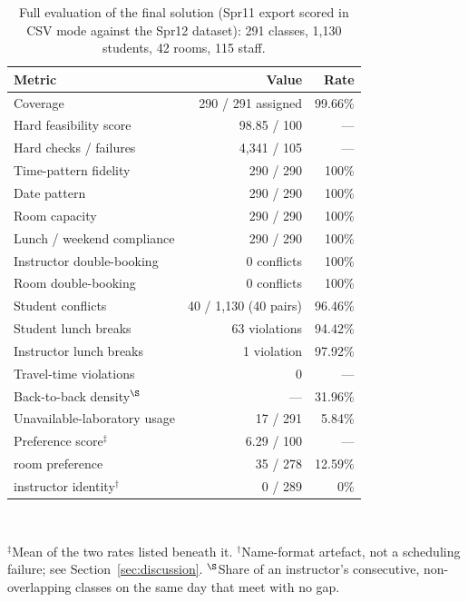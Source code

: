 \documentclass[journal]{IEEEtran}
\begin{document}
\begin{table}[t]
\centering
\caption{Full evaluation of the final solution (Spr11 export scored in CSV mode against the Spr12 dataset): 291 classes, 1{,}130 students, 42 rooms, 115 staff.}
\label{tab:final}
\footnotesize
\begin{tabular}{@{}lrr@{}}
\toprule
Metric & Value & Rate \\
\midrule
Coverage & 290 / 291 assigned & 99.66\% \\
Hard feasibility score & 98.85 / 100 & --- \\
Hard checks / failures & 4{,}341 / 105 & --- \\
Time-pattern fidelity & 290 / 290 & 100\% \\
Date pattern & 290 / 290 & 100\% \\
Room capacity & 290 / 290 & 100\% \\
Lunch / weekend compliance & 290 / 290 & 100\% \\
Instructor double-booking & 0 conflicts & 100\% \\
Room double-booking & 0 conflicts & 100\% \\
Student conflicts & 40 / 1{,}130 (40 pairs) & 96.46\% \\
Student lunch breaks & 63 violations & 94.42\% \\
Instructor lunch breaks & 1 violation & 97.92\% \\
Travel-time violations & 0 & --- \\
Back-to-back density$^{\S}$ & --- & 31.96\% \\
Unavailable-laboratory usage & 17 / 291 & 5.84\% \\
Preference score$^{\ddagger}$ & 6.29 / 100 & --- \\
\quad room preference & 35 / 278 & 12.59\% \\
\quad instructor identity$^{\dagger}$ & 0 / 289 & 0\% \\
\bottomrule
\end{tabular}
\\[2pt]
\raggedright\footnotesize $^{\ddagger}$Mean of the two rates listed beneath it. $^{\dagger}$Name-format artefact, not a scheduling failure; see Section~\ref{sec:discussion}. $^{\S}$Share of an instructor's consecutive, non-overlapping classes on the same day that meet with no gap.
\end{table}
\end{document}
